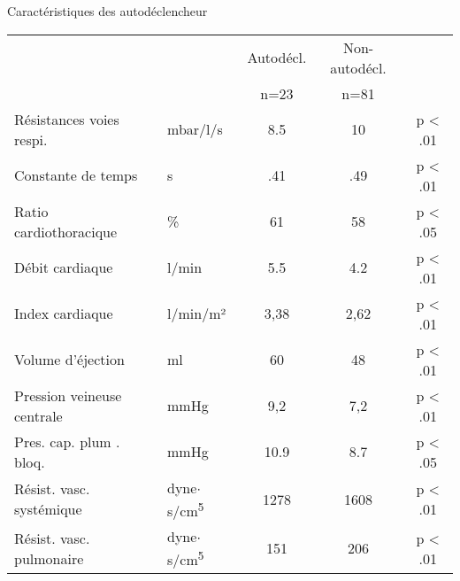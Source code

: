 \begin{frame}{Caractéristiques des autodéclencheur}
	\centering
	\def\mytblcolor{bleuclairchum}

	\def\pa{p < .01}
	\def\pb{p < .05}
	\def\urvasc{dyne$\cdot$s/cm\textsuperscript{5}}
	\begin{tabular}{l >{\scriptsize}l c c >{\scriptsize}c}
		                              &          & Autodécl.   &
		Non-autodécl. & \\
		                              &          & n=23 & n=81   & \\
		\hline
		\rowcolor{marinechum!80!black}
		Résistances voies respi.      & mbar/l/s & 8.5  & 10     & \pa \\
		\rowcolor{marinechum!80!black}
		Constante de temps            & s        & .41  & .49    & \pa \\
		Ratio cardiothoracique        & \%       & 61   & 58     & \pb \\
		\rowcolor{marinechum!80!black}
		Débit cardiaque               & l/min    & 5.5  & 4.2    & \pa \\
		\rowcolor{marinechum!80!black}
		Index cardiaque               & l/min/m² & 3,38 & 2,62   & \pa \\
		\rowcolor{marinechum!80!black}
		Volume d'éjection             & ml       & 60   & 48     & \pa \\
		Pression veineuse centrale    & mmHg     & 9,2  & 7,2    & \pa \\
		Pres. cap. plum . bloq.       & mmHg     & 10.9 & 8.7    & \pb \\
		\rowcolor{marinechum!80!black}
		Résist. vasc. systémique      & \urvasc  & 1278 & 1608   & \pa \\
		\rowcolor{marinechum!80!black}
		Résist. vasc. pulmonaire      & \urvasc  & 151  & 206    & \pa \\
		\hline
	\end{tabular}

\end{frame}
